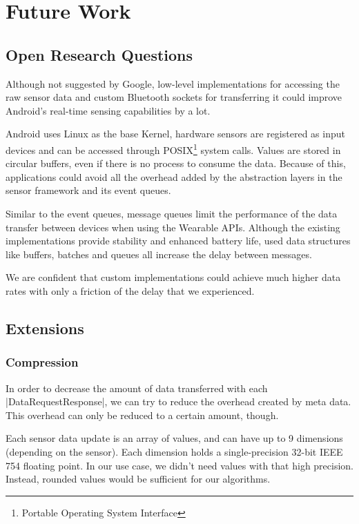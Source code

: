 \section{Future Work}
\label{sec:futurework}

\subsection{Open Research Questions}
Although not suggested by Google, low-level implementations for accessing the raw sensor data and custom Bluetooth sockets for transferring it could improve Android's real-time sensing capabilities by a lot.

Android uses Linux as the base Kernel, hardware sensors are registered as input devices and can be accessed through POSIX\footnote{Portable Operating System Interface} system calls. Values are stored in circular buffers, even if there is no process to consume the data.
Because of this, applications could avoid all the overhead added by the abstraction layers in the sensor framework and its event queues.

Similar to the event queues, message queues limit the performance of the data transfer between devices when using the Wearable APIs.
Although the existing implementations provide stability and enhanced battery life, used data structures like buffers, batches and queues all increase the delay between messages.

We are confident that custom implementations could achieve much higher data rates with only a friction of the delay that we experienced.

\clearpage

\subsection{Extensions}

\subsubsection{Compression}
In order to decrease the amount of data transferred with each |DataRequestResponse|\cite{sensordatalogger:datarequestresponse}, we can try to reduce the overhead created by meta data.
This overhead can only be reduced to a certain amount, though.

Each sensor data update is an array of values, and can have up to 9 dimensions (depending on the sensor).
Each dimension holds a single-precision 32-bit IEEE 754 floating point.
In our use case, we didn't need values with that high precision.
Instead, rounded values would be sufficient for our algorithms.

